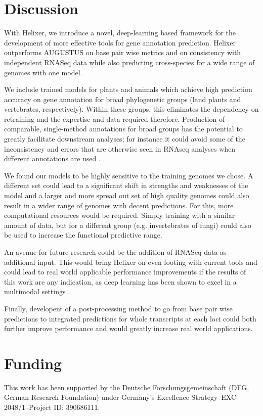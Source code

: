 \documentclass{bioinfo}
\begin{document}
\section{Discussion}
With Helixer, we introduce a novel, deep-learning based framework for the development 
of more effective tools for gene annotation prediction. 
Helixer outperforms AUGUSTUS on base pair wise metrics and on 
consistency with independent RNASeq data while also predicting cross-species for a wide range of  
genomes with one model. 

We include trained models for plants and animals which achieve 
high prediction accuracy on gene annotation for broad 
phylogenetic groups (land plants and vertebrates, respectively).
Within these groups, this eliminates the dependency on retraining and the
expertise and data required therefore. Production of comparable, single-method
annotations for broad groups has the potential to greatly facilitate downstream
analyses; for instance it could avoid some of the inconsistency and errors that
are otherwise seen in RNAseq analyses when different annotations are used 
\citep{zhao2015comprehensive,torres2016robust}.

We found our models to be highly sensitive to the training genomes we chose. A 
different set could lead to a significant shift in strengths and weaknesses of the 
model and a larger and more spread out set of high quality genomes could also result 
in a wider range of genomes with decent predictions. For this, more computational 
resources would be required. Simply training with a similar amount of data, 
but for a different group (e.g. invertebrates of fungi) could also be used to 
increase the functional predictive range. 

An avenue for future research could be the addition of RNASeq data as additional 
input. This would bring Helixer on even footing with current tools and could lead 
to real world applicable performance improvements if the results of this work are 
any indication, as deep learning has been shown to excel in a multimodal settings 
\citep{ching2018opportunities}.

Finally, developent of a post-processing method
to go from base pair wise predictions to integrated predictions for whole 
transcripts at each loci could both further improve performance and would
greatly increase real world applications.

\section*{Funding}
This work has been supported by the Deutsche Forschungsgemeinschaft (DFG, German Research Foundation) 
under Germany's Excellence Strategy--EXC-2048/1--Project ID: 390686111.\vspace*{-12pt}
\end{document}
